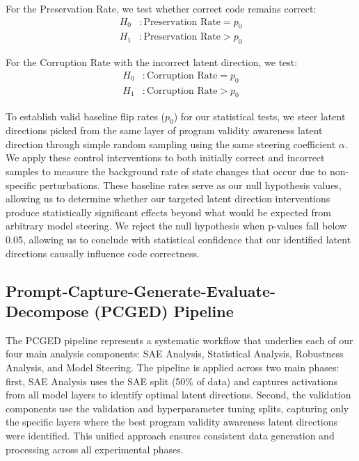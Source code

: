 \documentclass[11pt]{article}
\begin{document}
For the Preservation Rate, we test whether correct code remains correct:
\begin{align}
H_0&: \text{Preservation Rate} = p_0 \\
H_1&: \text{Preservation Rate} > p_0
\end{align}

For the Corruption Rate with the incorrect latent direction, we test:
\begin{align}
H_0&: \text{Corruption Rate} = p_0 \\
H_1&: \text{Corruption Rate} > p_0
\end{align}

To establish valid baseline flip rates ($p_0$) for our statistical tests, we steer latent directions picked from the same layer of program validity awareness latent direction through simple random sampling using the same steering coefficient $\alpha$. We apply these control interventions to both initially correct and incorrect samples to measure the background rate of state changes that occur due to non-specific perturbations. These baseline rates serve as our null hypothesis values, allowing us to determine whether our targeted latent direction interventions produce statistically significant effects beyond what would be expected from arbitrary model steering.  We reject the null hypothesis when p-values fall below 0.05, allowing us to conclude with statistical confidence that our identified latent directions causally influence code correctness.

\subsection{Prompt-Capture-Generate-Evaluate-\\Decompose (PCGED) Pipeline}
\label{sec:pcged}

The PCGED pipeline represents a systematic workflow that underlies each of our four main analysis components: SAE Analysis, Statistical Analysis, Robustness Analysis, and Model Steering. The pipeline is applied across two main phases: first, SAE Analysis uses the SAE split (50\% of data) and captures activations from all model layers to identify optimal latent directions. Second, the validation components use the validation and hyperparameter tuning splits, capturing only the specific layers where the best program validity awareness latent directions were identified. This unified approach ensures consistent data generation and processing across all experimental phases.
\end{document}
